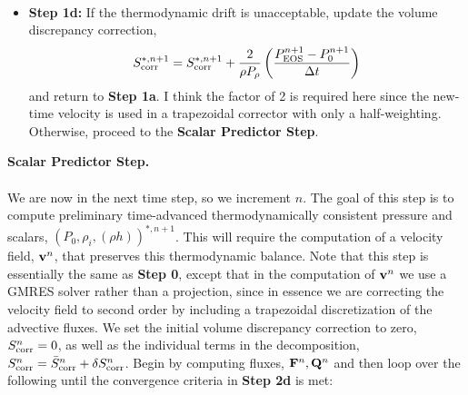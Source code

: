\documentclass[final]{siamltex}
\def\Fb {{\bf F}}
\def\Qb {{\bf Q}}
\def\vb {{\bf v}}
\begin{document}
\begin{itemize}
\begin{eqnarray}
\end{eqnarray}
\item {\bf Step 1d:} If the thermodynamic drift is unacceptable, update the volume 
discrepancy correction,
\begin{equation}
S_{\rm corr}^{*,n+1} = S_{\rm corr}^{*,n+1} + \frac{2}{\rho P_\rho}\left(\frac{P_{\rm EOS}^{n+1} - P_0^{n+1}}{\Delta t}\right)
\end{equation}
and return to {\bf Step 1a}.  I think the factor of 2 is required here since the new-time
velocity is used in a trapezoidal corrector with only a half-weighting.  Otherwise, 
proceed to the {\bf Scalar Predictor Step}.\\
\end{itemize}
{\bf Scalar Predictor Step.}\\ \\
We are now in the next time step, so we increment $n$.
The goal of this step is to compute preliminary time-advanced thermodynamically
consistent pressure and scalars, $(P_0,\rho_i,(\rho h))^{*,n+1}$.  This will
require the computation of a velocity field, $\vb^n$, that preserves this
thermodynamic balance.  Note that this step is essentially the same as
{\bf Step 0}, except that in the computation of $\vb^n$ we use a GMRES
solver rather than a projection, since in essence we are correcting the velocity
field to second order by including a trapezoidal discretization of the advective fluxes.
We set the initial volume discrepancy correction to zero, 
$S_{\rm corr}^n = 0$, as well as the individual terms in the decomposition,
$S_{\rm corr}^n = \bar{S}_{\rm corr}^n + \delta S_{\rm corr}^n$.
Begin by computing fluxes, $\Fb^n, \Qb^n$ and then loop over the following until 
the convergence criteria in {\bf Step 2d} is met:\\
\end{document}
